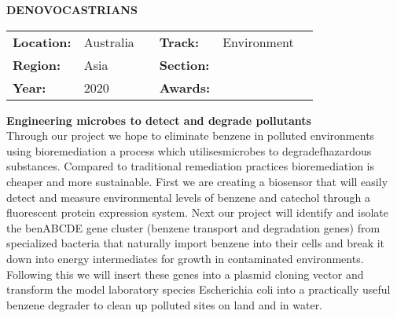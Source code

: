 \textbf{\uppercase{DeNovocastrians}} \FloatBarrier \begin{table}[h] \begin{tabular}{lp{2.5cm}llll} \textbf{Location:} & Australia & \multicolumn{1}{|l}{} & \textbf{Track:}   & Environment \\ \textbf{Region:}   & Asia   & \multicolumn{1}{|l}{} & \textbf{Section:} &  \\ \textbf{Year:}     & 2020   & \multicolumn{1}{|l}{} & \textbf{Awards:}  & \end{tabular} \end{table} \FloatBarrier \noindent\textbf{Engineering microbes to detect and degrade pollutants} \vspace{.2cm}\\ 
Through our project we hope to eliminate benzene in polluted environments using bioremediation a process which utilisesmicrobes to degradefhazardous substances. Compared to traditional remediation practices bioremediation is cheaper and more sustainable. First we are creating a biosensor that will easily detect and measure environmental levels of benzene and catechol through a fluorescent protein expression system. Next our project will identify and isolate the benABCDE gene cluster (benzene transport and degradation genes) from specialized bacteria that naturally import benzene into their cells and break it down into energy intermediates for growth in contaminated environments. Following this we will insert these genes into a plasmid cloning vector and transform the model laboratory species Escherichia coli into a practically useful benzene degrader to clean up polluted sites on land and in water.
\vspace{2cm}

